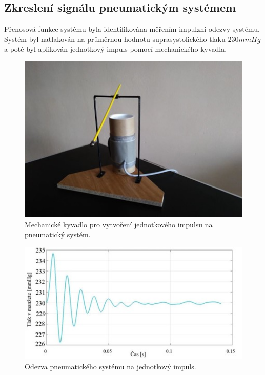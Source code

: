\subsection{Zkreslení signálu pneumatickým systémem}
Přenosová funkce systému byla identifikována měřením impulzní odezvy systému. Systém byl natlakován na průměrnou hodnotu suprasystolického tlaku $230 mmHg$ a poté
byl aplikován jednotkový impuls pomocí mechanického kyvadla. \cite{cite:Patricia}
\begin{figure}[H]
    \label{fig:mech_kyvadlo}
    \includegraphics[width=1\textwidth]{pictures/mech_kyvadlo.jpg}
    \caption{Mechanické kyvadlo pro vytvoření jednotkového impulsu na pneumatický systém. \cite{cite:Patricia}}
\end{figure}
\begin{figure}[H]
    \label{fig:pneu_impulse_response}
    \includegraphics[width=1\textwidth]{pictures/pneu_impulse.jpg}
    \caption{Odezva pneumatického systému na jednotkový impuls. \cite{cite:Patricia}}
\end{figure}
